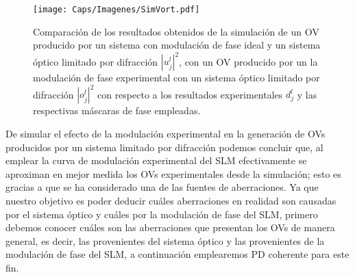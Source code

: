 \begin{figure}[!ht]
  \centering
    \texttt{[image: Caps/Imagenes/SimVort.pdf]}
  \caption[Comparación de los resultados de la simulación de la curva de modulación con resultados experimentales.]{Comparación de los resultados obtenidos de la simulación de un OV producido por un sistema con modulación de fase ideal y un sistema óptico limitado por difracción $|u_j^l|^2$, con un OV producido por un la modulación de fase experimental con un sistema óptico limitado por difracción $|o_j^l|^2$ con respecto a los resultados experimentales $d_j^l$ y las respectivas máscaras de fase empleadas.}
  \label{fig:simvort}
\end{figure}

De simular el efecto de la modulación experimental en la generación de OVs producidos por un sistema limitado por difracción podemos concluir que, al emplear la curva de modulación experimental del SLM efectivamente se aproximan en mejor medida los OVs experimentales desde la simulación; esto es gracias a que se ha considerado una de las fuentes de aberraciones. Ya que nuestro objetivo es poder deducir cuáles aberraciones en realidad son causadas por el sistema óptico y cuáles por la modulación de fase del SLM, primero debemos conocer cuáles son las aberraciones que presentan los OVs de manera general, es decir, las provenientes del sistema óptico y las provenientes de la modulación de fase del SLM, a continuación emplearemos PD coherente para este fin.



